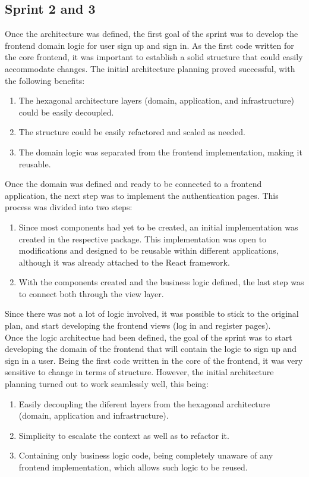 \documentclass[../memory.tex]{subfiles}
\begin{document}
\subsection{Sprint 2 and 3}
Once the architecture was defined, the first goal of the sprint was to develop
the frontend domain logic for user sign up and sign in. As the first code
written for the core frontend, it was important to establish a solid structure
that could easily accommodate changes. The initial architecture planning proved
successful, with the following benefits:
\begin{enumerate}[label = -]
	\item The hexagonal architecture layers (domain, application, and
	      infrastructure) could be easily decoupled.
	\item The structure could be easily refactored and scaled as needed.
	\item The domain logic was separated from the frontend implementation, making
	      it reusable.
\end{enumerate}
Once the domain was defined and ready to be connected to a frontend application,
the next step was to implement the authentication pages. This process was
divided into two steps:
\begin{enumerate}[label = \arabic{*}.]
	\item Since most components had yet to be created, an initial implementation
	      was created in the respective package. This implementation was open to
	      modifications and designed to be reusable within different applications,
	      although it was already attached to the React framework.
	\item With the components created and the business logic defined, the last
	      step was to connect both through the view layer.
\end{enumerate}
Since there was not a lot of logic involved, it was possible to stick to the
original plan, and start developing the frontend views (log in and register
pages).
\\[8pt]
Once the logic architectue had been defined, the goal of the sprint was to start
developing the domain of the frontend that will contain the logic to sign up and
sign in a user. Being the first code written in the core of the frontend, it was
very sensitive to change in terms of structure. However, the initial
architecture planning turned out to work seamlessly well, this being:
\begin{enumerate}[label = -]
	\item Easily decoupling the diferent layers from the hexagonal architecture
	      (domain, application and infrastructure).
	\item Simplicity to escalate the context as well as to refactor it.
	\item Containing only business logic code, being completely unaware of any
	      frontend implementation, which allows such logic to be reused.
\end{enumerate}
\end{document}
